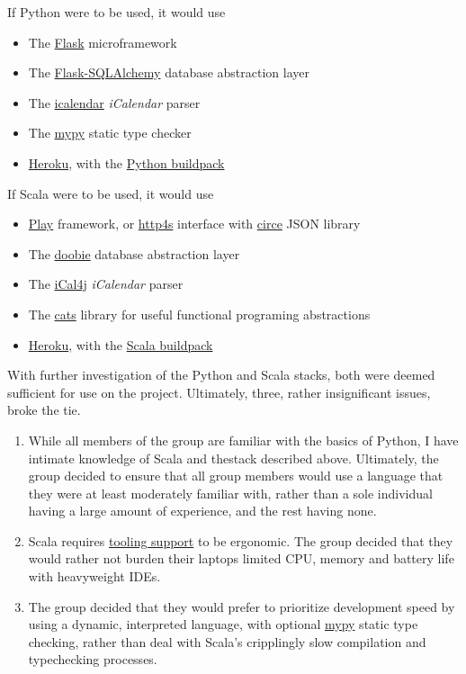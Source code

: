 \documentclass[8pt,a4paper]{report}
\begin{document}
If Python were to be used, it would use

\begin{itemize} 
    \item The \href{http://flask.pocoo.org/}{Flask} microframework
    \item The \href{http://flask-sqlalchemy.pocoo.org/2.1/}{Flask-SQLAlchemy} database abstraction layer
    \item The \href{https://pypi.python.org/pypi/icalendar}{icalendar} \textit{iCalendar} parser
    \item The \href{http://mypy-lang.org/}{mypy} static type checker
    \item \href{https://www.heroku.com/}{Heroku}, with the \href{https://github.com/heroku/heroku-buildpack-python}{Python buildpack}
\end{itemize}


If Scala were to be used, it would use

\begin{itemize}
    \item \href{https://www.playframework.com/}{Play} framework, or \href{https://github.com/http4s/http4s}{http4s} interface with \href{https://github.com/circe/circe}{circe} JSON library
    \item The \href{https://github.com/tpolecat/doobie}{doobie} database abstraction layer
    \item The \href{https://github.com/ical4j/ical4j}{iCal4j} \textit{iCalendar} parser
    \item The \href{https://github.com/typelevel/cats}{cats} library for useful functional programing abstractions
    \item \href{https://www.heroku.com/}{Heroku}, with the \href{https://github.com/heroku/heroku-buildpack-scala}{Scala buildpack}
\end{itemize}


With further investigation of the Python and Scala stacks, both were deemed sufficient for use on the project. Ultimately, three, rather insignificant issues, broke the tie.

\begin{enumerate}
    \item While all members of the group are familiar with the basics of Python, I have intimate knowledge of Scala and thestack described above. Ultimately, the group decided to ensure that all group members would use a language that they were at least moderately familiar with, rather than a sole individual having a large amount of experience, and the rest having none.
    \item Scala requires \href{https://plugins.jetbrains.com/plugin/1347-scala}{tooling support} to be ergonomic. The group decided that they would rather not burden their laptops limited CPU, memory and battery life with heavyweight IDEs.
    \item The group decided that they would prefer to prioritize development speed by using a dynamic, interpreted language, with optional \href{http://mypy-lang.org/}{mypy} static type checking, rather than deal with Scala's cripplingly slow compilation and typechecking processes.
\end{enumerate}
\end{document}
